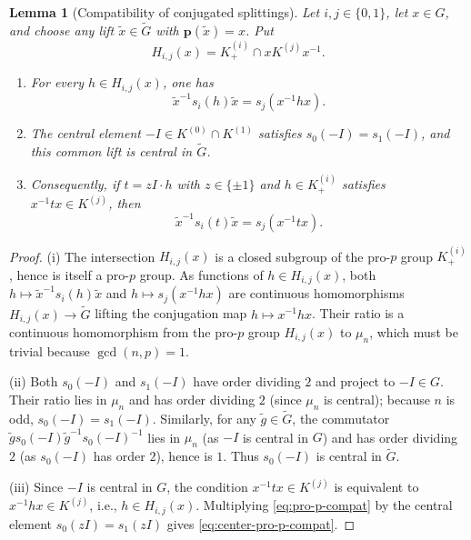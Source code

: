 \documentclass[12pt, letterpaper]{article}
\numberwithin{equation}{section}
\newtheorem{lemma}[theorem]{Lemma}
\theoremstyle{definition}
\theoremstyle{remark}
\newcommand{\wtG}{\widetilde{G}}
\begin{document}
\begin{lemma}[Compatibility of conjugated splittings]\label{lem:splittings-compat}
Let $i,j\in\{0,1\}$, let $x\in G$, and choose any lift $\widetilde{x}\in\wtG$ with $\mathbf{p}(\widetilde{x})=x$. Put
\[
 H_{i,j}(x)=K^{(i)}_+\cap xK^{(j)}x^{-1}.
\]
\begin{enumerate}[label=(\roman*)]
 \item For every $h\in H_{i,j}(x)$, one has
 \begin{equation}\label{eq:pro-p-compat}
  \widetilde{x}^{-1}s_i(h)\widetilde{x}=s_j(x^{-1}hx).
 \end{equation}
 \item The central element $-I\in K^{(0)}\cap K^{(1)}$ satisfies $s_0(-I)=s_1(-I)$, and this common lift is central in $\wtG$.
 \item Consequently, if $t=zI\cdot h$ with $z\in\{\pm 1\}$ and $h\in K^{(i)}_+$ satisfies $x^{-1}tx\in K^{(j)}$, then
 \begin{equation}\label{eq:center-pro-p-compat}
  \widetilde{x}^{-1}s_i(t)\widetilde{x}=s_j(x^{-1}tx).
 \end{equation}
\end{enumerate}
\end{lemma}
\begin{proof}
(i) The intersection $H_{i,j}(x)$ is a closed subgroup of the pro-$p$ group $K^{(i)}_+$, hence is itself a pro-$p$ group. As functions of $h\in H_{i,j}(x)$, both $h\mapsto\widetilde{x}^{-1}s_i(h)\widetilde{x}$ and $h\mapsto s_j(x^{-1}hx)$ are continuous homomorphisms $H_{i,j}(x)\to\wtG$ lifting the conjugation map $h\mapsto x^{-1}hx$. Their ratio is a continuous homomorphism from the pro-$p$ group $H_{i,j}(x)$ to $\mu_n$, which must be trivial because $\gcd(n,p)=1$.

(ii) Both $s_0(-I)$ and $s_1(-I)$ have order dividing $2$ and project to $-I\in G$. Their ratio lies in $\mu_n$ and has order dividing $2$ (since $\mu_n$ is central); because $n$ is odd, $s_0(-I)=s_1(-I)$. Similarly, for any $\widetilde{g}\in\wtG$, the commutator $\widetilde{g}s_0(-I)\widetilde{g}^{-1}s_0(-I)^{-1}$ lies in $\mu_n$ (as $-I$ is central in $G$) and has order dividing $2$ (as $s_0(-I)$ has order $2$), hence is $1$. Thus $s_0(-I)$ is central in $\wtG$.

(iii) Since $-I$ is central in $G$, the condition $x^{-1}tx\in K^{(j)}$ is equivalent to $x^{-1}hx\in K^{(j)}$, i.e., $h\in H_{i,j}(x)$. Multiplying \eqref{eq:pro-p-compat} by the central element $s_0(zI)=s_1(zI)$ gives \eqref{eq:center-pro-p-compat}.
\end{proof}
\end{document}
